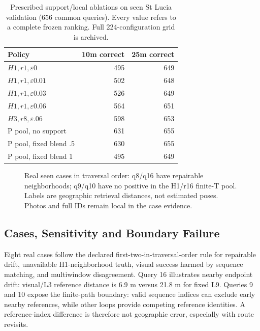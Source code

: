\documentclass[conference]{IEEEtran}
\begin{document}
\begin{table}[!t]\centering\small
\caption{Prescribed support/local ablations on seen St Lucia validation (656 common queries). Every value refers to a complete frozen ranking. Full 224-configuration grid is archived.}\label{tab:ablation}
\begin{tabular}{lrr}\toprule
Policy & 10m correct & 25m correct\\\midrule
$H1,r1,\varepsilon0$ & 495 & 649\\
$H1,r1,\varepsilon0.01$ & 502 & 648\\
$H1,r1,\varepsilon0.03$ & 526 & 649\\
$H1,r1,\varepsilon0.06$ & 564 & 651\\
$H3,r8,\varepsilon.06$ & 598 & 653\\
P pool, no support & 631 & 655\\
P pool, fixed blend .5 & 630 & 655\\
P pool, fixed blend 1 & 495 & 649\\
\bottomrule\end{tabular}\end{table}

\begin{figure}[t]\centering
{}
\caption{Real seen cases in traversal order: q8/q16 have repairable neighborhoods; q9/q10 have no positive in the H1/r16 finite-T pool. Labels are geographic retrieval distances, not estimated poses. Photos and full IDs remain local in the case evidence.}\label{fig:cases}\end{figure}

\subsection{Cases, Sensitivity and Boundary Failure}
Eight real cases follow the declared first-two-in-traversal-order rule for repairable drift, unavailable H1-neighborhood truth, visual success harmed by sequence matching, and multiwindow disagreement. Query 16 illustrates nearby endpoint drift: visual/L3 reference distance is 6.9 m versus 21.8 m for fixed L9. Queries 9 and 10 expose the finite-path boundary: valid sequence indices can exclude early nearby references, while other loops provide competing reference identities. A reference-index difference is therefore not geographic error, especially with route revisits.
\end{document}
